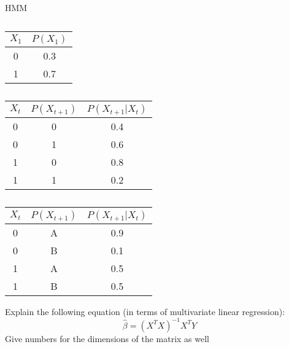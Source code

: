 \documentclass[12pt]{exam}
\begin{document}
\begin{questions}
\begin{table}[!htb]
    \caption{HMM}
    \begin{minipage}{.2\linewidth}
      \caption{}
      \centering
        \begin{tabular}{ |c|c| } 
 \hline
 $X_1$ & $P(X_1)$  \\ 
 \hline
 0 & 0.3  \\ 
 1 & 0.7  \\ 
 \hline
\end{tabular}
    \end{minipage}%
     \begin{minipage}{.4\linewidth}
      \centering
        \caption{}
        \begin{tabular}{ |c|c|c| } 
 \hline
 $X_t$ & $P(X_{t+1})$ &  $P(X_{t+1}|X_t)$\\ 
 \hline
 0 & 0 & 0.4  \\ 
 0 & 1 & 0.6  \\ 
 \hline
 1 & 0 & 0.8  \\ 
 1 & 1 & 0.2  \\
 \hline
\end{tabular}
    \end{minipage}
    \begin{minipage}{.4\linewidth}
      \centering
        \caption{}
        \begin{tabular}{ |c|c|c| } 
 \hline
 $X_t$ & $P(X_{t+1})$ &  $P(X_{t+1}|X_t)$\\ 
 \hline
 0 & A & 0.9  \\ 
 0 & B & 0.1  \\ 
 \hline
 1 & A & 0.5  \\ 
 1 & B & 0.5  \\
 \hline
\end{tabular}
    \end{minipage} 
\end{table}
\noaddpoints %

\addpoints
\question[4]
Explain the following equation (in terms of multivariate linear regression):\\
\begin{equation}
\hat{\beta} = (X^TX)^{-1}X^TY
\end{equation}
Give numbers for the dimensions of the matrix as well
\makeemptybox{3in}
\end{questions}
\end{document}

